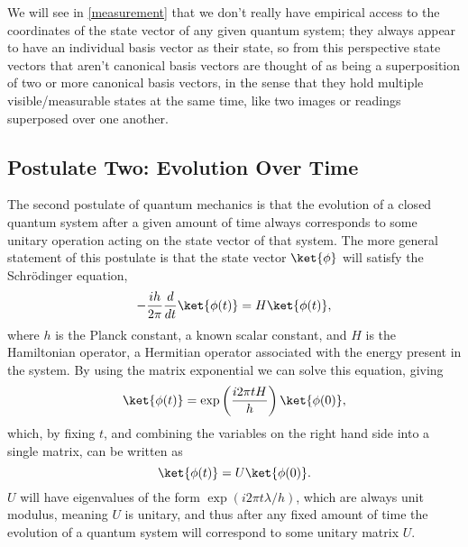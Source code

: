 We will see in \autoref{measurement} that we don't really have empirical access to the coordinates of the state vector of any given quantum system; they always appear to have an individual basis vector as their state, so from this perspective state vectors that aren't canonical basis vectors are thought of as being a superposition of two or more canonical basis vectors, in the sense that they hold multiple visible/measurable states at the same time, like two images or readings superposed over one another.

\subsection{Postulate Two: Evolution Over Time}\label{evolution}
The second postulate of quantum mechanics is that the evolution of a closed quantum system after a given amount of time always corresponds to some unitary operation acting on the state vector of that system. The more general statement of this postulate is that the state vector $\ket{\phi}$ will satisfy the Schrödinger equation,
\[-\frac{ih}{2\pi}\frac{d}{dt}\ket{\phi(t)} = H\ket{\phi(t)},\]
where $h$ is the Planck constant, a known scalar constant, and $H$ is the Hamiltonian operator, a Hermitian operator associated with the energy present in the system. By using the matrix exponential we can solve this equation, giving
\[\ket{\phi(t)} = \exp\left(\frac{i 2\pi tH}{h}\right)\ket{\phi(0)},\]
which, by fixing $t$, and combining the variables on the right hand side into a single matrix, can be written as
\[\ket{\phi(t)} = U\ket{\phi(0)}.\]
$U$ will have eigenvalues of the form $\exp(i2\pi t\lambda/h)$, which are always unit modulus, meaning $U$ is unitary, and thus after any fixed amount of time the evolution of a quantum system will correspond to some unitary matrix $U$.

